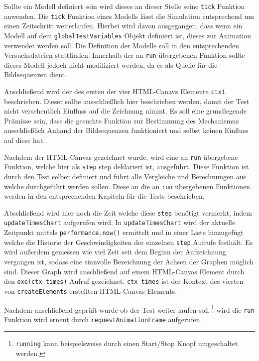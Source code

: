 Sollte ein  Modell definiert sein wird dieses an dieser Stelle seine \lstinline{tick} Funktion anwenden.
Die \lstinline{tick} Funktion eines  Modells lässt die Simulation entsprechend um einen Zeitschritt weiterlaufen.
Hierbei wird davon ausgegangen, dass wenn ein  Modell auf dem \lstinline{globalTestVariables} Objekt definiert ist, dieses zur Animation verwendet werden soll.
Die Definition der Modelle soll in den entsprechenden Versuchsdateien stattfinden.
Innerhalb der an \lstinline{run} übergebenen Funktion sollte dieses Modell jedoch nicht modifiziert werden, da es als Quelle für die Bildsequenzen dient.

Anschließend wird der  des ersten der vier HTML-Canavs Elemente \lstinline{ctx1} beschrieben.
Dieser sollte ausschließlich hier beschrieben werden, damit der Test nicht versehentlich Einfluss auf die Zeichnung nimmt.
Es soll eine grundlegende Prämisse sein, dass die gesuchte Funktion zur Bestimmung des Mechanismus ausschließlich Anhand der Bildsequenzen funktioniert und selbst keinen Einfluss auf diese hat.

Nachdem der HTML-Canvas gezeichnet wurde, wird eine an \lstinline{run} übergebene Funktion, welche hier als \lstinline{step} step deklariert ist, ausgeführt.
Diese Funktion ist durch den Test selber definiert und führt alle Vergleiche und Berechnungen aus welche durchgeführt werden sollen.
Diese an die an \lstinline{run} übergebenen Funktionen werden in den entsprechenden Kapiteln für die Tests beschrieben.

Abschließend wird hier noch die Zeit welche diese \lstinline{step} benötigt vermerkt, indem \lstinline{updateTimesChart} aufgerufen wird.
In \lstinline{updateTimesChart} wird der aktuelle Zeitpunkt mittels \lstinline{performance.now()} %
ermittelt und in einer Liste hinzugefügt welche die Historie der Geschwindigkeiten der einzelnen \lstinline{step} Aufrufe festhält.
Es wird außerdem gemessen wie viel Zeit seit dem Beginn der Aufzeichnung vergangen ist, sodass eine sinnvolle Bezeichnung der Achsen der Graphen möglich sind.
Dieser Graph wird anschließend auf einem HTML-Canvas Element durch den \lstinline{exe(ctx_times)} Aufruf gezeichnet.
\lstinline{ctx_times} ist der Kontext des vierten von \lstinline{createElements} erstellten HTML-Canvas Elements.

Nachdem anschließend geprüft wurde ob der Test weiter laufen soll \footnote{\lstinline{running} kann beispielsweise durch einen Start/Stop Knopf umgeschaltet werden.} wird die \lstinline{run} Funktion wird erneut durch \lstinline{requestAnimationFrame} aufgerufen.

